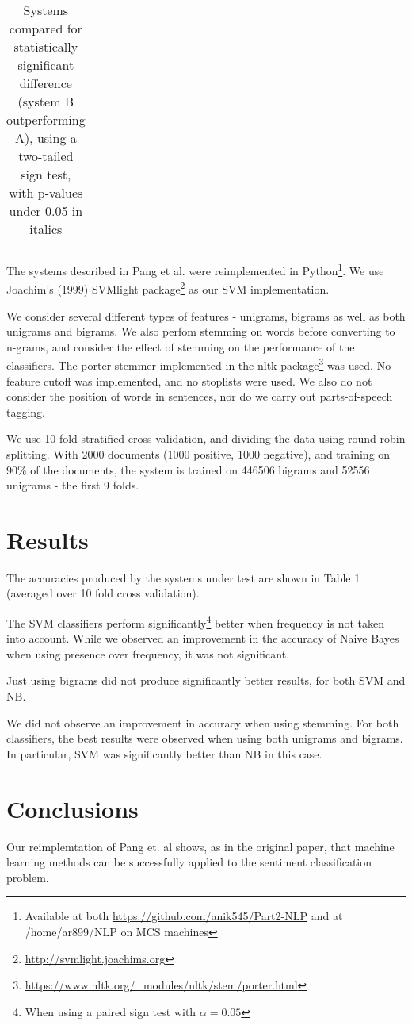 \documentclass[12pt,a4paper]{article}
\begin{document}
\begin{multicols}{2}
\begin{table*}
\begin{tabular}{|l|l|l|}
  \end{tabular}
  \caption{Systems compared for statistically significant difference (system B outperforming A), using a two-tailed sign test, with p-values under 0.05 in italics}
  \label{tab:significances}
\end{table*}

The systems described in Pang et al. were reimplemented in Python\footnote{Available at both \url{https://github.com/anik545/Part2-NLP} and at /home/ar899/NLP on MCS machines}. We use Joachim's (1999) SVMlight package\footnote{\url{http://svmlight.joachims.org}} as our SVM implementation.

We consider several different types of features - unigrams, bigrams as well as both unigrams and bigrams. We also perfom stemming on words before converting to n-grams, and consider the effect of stemming on the performance of the classifiers. The porter stemmer implemented in the nltk package\footnote{\url{https://www.nltk.org/_modules/nltk/stem/porter.html}} was used. No feature cutoff was implemented, and no stoplists were used. We also do not consider the position of words in sentences, nor do we carry out parts-of-speech tagging.

We use 10-fold stratified cross-validation, and dividing the data using round robin splitting. With 2000 documents (1000 positive, 1000 negative), and training on 90\% of the documents, the system is trained on 446506 bigrams and 52556 unigrams - the first 9 folds.

\section{Results}

The accuracies produced by the systems under test are shown in Table 1 (averaged over 10 fold cross validation).

The SVM classifiers perform significantly\footnote{When using a paired sign test with $\alpha = 0.05$} better when frequency is not taken into account. While we observed an improvement in the accuracy of Naive Bayes when using presence over frequency, it was not significant.

Just using bigrams did not produce significantly better results, for both SVM and NB.

We did not observe an improvement in accuracy when using stemming. For both classifiers, the best results were observed when using both unigrams and bigrams. In particular, SVM was significantly better than NB in this case.

\section{Conclusions}

Our reimplemtation of Pang et. al shows, as in the original paper, that machine learning methods can be successfully applied to the sentiment classification problem.

\end{multicols}

\clearpage

\end{document}
